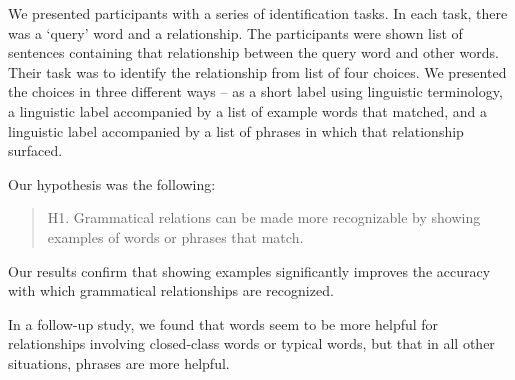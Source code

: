 \documentclass{sigchi}
\begin{document}
We presented participants with a series of identification tasks. In each task, there was a `query' word and a relationship. The participants were shown list of sentences containing that relationship between the query word and other words. Their task was to identify the relationship from list of four choices. We presented the choices in three different ways -- as a short label using linguistic terminology, a linguistic label accompanied by a list of example words that matched, and a linguistic label accompanied by a list of phrases in which that relationship surfaced. 

Our hypothesis was the following:
\begin{quote}
	H1. Grammatical relations can be made more recognizable by showing examples of words or phrases that match.
\end{quote}

Our results confirm that showing examples significantly improves the accuracy with which grammatical relationships are recognized.

In a follow-up study, we found that words seem to be more helpful for relationships involving closed-class words or typical words, but that in all other situations, phrases are more helpful.






\end{document}
